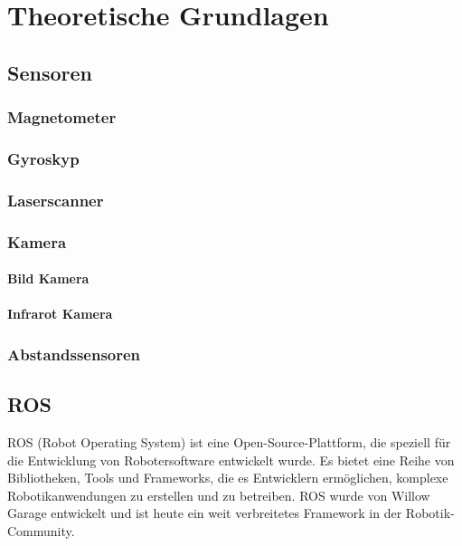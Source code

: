 \chapter{Theoretische Grundlagen}


\section{Sensoren}

    \subsection{Magnetometer}

    \subsection{Gyroskyp}

    \subsection{Laserscanner}

    \subsection{Kamera}

        \subsubsection{Bild Kamera}

        \subsubsection{Infrarot Kamera}

    \subsection{Abstandssensoren}


\section{ROS}

ROS (Robot Operating System) ist eine Open-Source-Plattform, die speziell für die Entwicklung von Robotersoftware entwickelt wurde. Es bietet eine Reihe von Bibliotheken, Tools und Frameworks, die es Entwicklern ermöglichen, komplexe Robotikanwendungen zu erstellen und zu betreiben. ROS wurde von Willow Garage entwickelt und ist heute ein weit verbreitetes Framework in der Robotik-Community.

